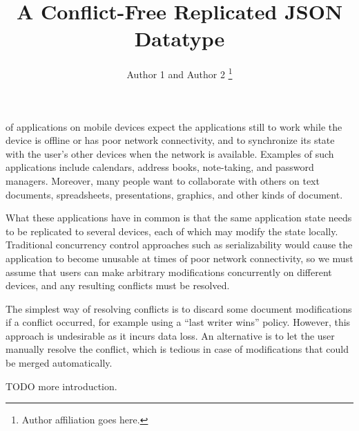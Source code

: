 \documentclass[10pt,journal,compsoc]{IEEEtran}
\begin{document}
\sloppy
\title{A Conflict-Free Replicated JSON Datatype}
\author{Author 1 and Author 2
\thanks{Author affiliation goes here.}}

\maketitle


 of applications on mobile devices expect the applications still to work while the device is offline or has poor network connectivity, and to synchronize its state with the user's other devices when the network is available. Examples of such applications include calendars, address books, note-taking, and password managers. Moreover, many people want to collaborate with others on text documents, spreadsheets, presentations, graphics, and other kinds of document.

What these applications have in common is that the same application state needs to be replicated to several devices, each of which may modify the state locally. Traditional concurrency control approaches such as serializability would cause the application to become unusable at times of poor network connectivity, so we must assume that users can make arbitrary modifications concurrently on different devices, and any resulting conflicts must be resolved.

The simplest way of resolving conflicts is to discard some document modifications if a conflict occurred, for example using a ``last writer wins'' policy. However, this approach is undesirable as it incurs data loss. An alternative is to let the user manually resolve the conflict, which is tedious in case of modifications that could be merged automatically.

TODO more introduction.

%
\end{document}
